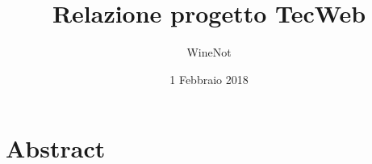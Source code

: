 



\title{\textbf{Relazione progetto TecWeb}}
\author{WineNot}

\date{1 Febbraio 2018}




\makeFrontPage

\tableofcontents

\newpage

\section{Abstract}

